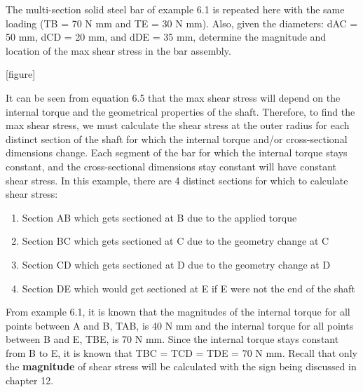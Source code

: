 \documentclass[
  letterpaper,
  DIV=11,
  numbers=noendperiod]{scrreprt}
\providecommand{\tightlist}{%
  \setlength{\itemsep}{0pt}\setlength{\parskip}{0pt}}\usepackage{longtable,booktabs,array}
\begin{document}
\begin{tcolorbox}[enhanced jigsaw, breakable, opacityback=0, toptitle=1mm, left=2mm, colback=white, opacitybacktitle=0.6, colframe=quarto-callout-note-color-frame, titlerule=0mm, arc=.35mm, leftrule=.75mm, bottomtitle=1mm, colbacktitle=quarto-callout-note-color!10!white, rightrule=.15mm, title={Example 6.2}, bottomrule=.15mm, toprule=.15mm, coltitle=black]

The multi-section solid steel bar of example 6.1 is repeated here with
the same loading (TB = 70 N mm and TE = 30 N mm). Also, given the
diameters: dAC = 50 mm, dCD = 20 mm, and dDE = 35 mm, determine the
magnitude and location of the max shear stress in the bar assembly.

{[}figure{]}

\begin{tcolorbox}[enhanced jigsaw, breakable, opacityback=0, toptitle=1mm, left=2mm, colback=white, opacitybacktitle=0.6, colframe=quarto-callout-note-color-frame, titlerule=0mm, arc=.35mm, leftrule=.75mm, bottomtitle=1mm, colbacktitle=quarto-callout-note-color!10!white, rightrule=.15mm, title={Solution}, bottomrule=.15mm, toprule=.15mm, coltitle=black]

It can be seen from equation 6.5 that the max shear stress will depend
on the internal torque and the geometrical properties of the shaft.
Therefore, to find the max shear stress, we must calculate the shear
stress at the outer radius for each distinct section of the shaft for
which the internal torque and/or cross-sectional dimensions change. Each
segment of the bar for which the internal torque stays constant, and the
cross-sectional dimensions stay constant will have constant shear
stress. In this example, there are 4 distinct sections for which to
calculate shear stress:

\begin{enumerate}
\def\labelenumi{\arabic{enumi}.}
\tightlist
\item
  Section AB which gets sectioned at B due to the applied torque
\item
  Section BC which gets sectioned at C due to the geometry change at C
\item
  Section CD which gets sectioned at D due to the geometry change at D
\item
  Section DE which would get sectioned at E if E were not the end of the
  shaft
\end{enumerate}

From example 6.1, it is known that the magnitudes of the internal torque
for all points between A and B, TAB, is 40 N mm and the internal torque
for all points between B and E, TBE, is 70 N mm. Since the internal
torque stays constant from B to E, it is known that TBC = TCD = TDE = 70
N mm. Recall that only the \textbf{magnitude} of shear stress will be
calculated with the sign being discussed in chapter 12.


\end{tcolorbox}
\end{tcolorbox}
\end{document}
